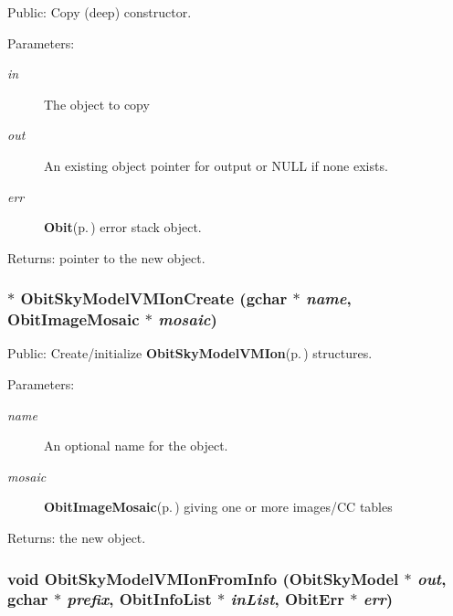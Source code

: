Public: Copy (deep) constructor. 

\begin{Desc}
\item[Parameters:]
\begin{description}
\item[{\em in}]The object to copy \item[{\em out}]An existing object pointer for output or NULL if none exists. \item[{\em err}]{\bf Obit}{\rm (p.\,\pageref{structObit})} error stack object. \end{description}
\end{Desc}
\begin{Desc}
\item[Returns:]pointer to the new object. \end{Desc}
\subsubsection{$\ast$ Obit\-Sky\-Model\-VMIon\-Create (gchar $\ast$ {\em name}, {\bf Obit\-Image\-Mosaic} $\ast$ {\em mosaic})}\label{ObitSkyModelVMIon_8h_a6}


Public: Create/initialize {\bf Obit\-Sky\-Model\-VMIon}{\rm (p.\,\pageref{structObitSkyModelVMIon})} structures. 

\begin{Desc}
\item[Parameters:]
\begin{description}
\item[{\em name}]An optional name for the object. \item[{\em mosaic}]{\bf Obit\-Image\-Mosaic}{\rm (p.\,\pageref{structObitImageMosaic})} giving one or more images/CC tables \end{description}
\end{Desc}
\begin{Desc}
\item[Returns:]the new object. \end{Desc}
\subsubsection{\setlength{\rightskip}{0pt plus 5cm}void Obit\-Sky\-Model\-VMIon\-From\-Info ({\bf Obit\-Sky\-Model} $\ast$ {\em out}, gchar $\ast$ {\em prefix}, {\bf Obit\-Info\-List} $\ast$ {\em in\-List}, {\bf Obit\-Err} $\ast$ {\em err})}\label{ObitSkyModelVMIon_8h_a5}


